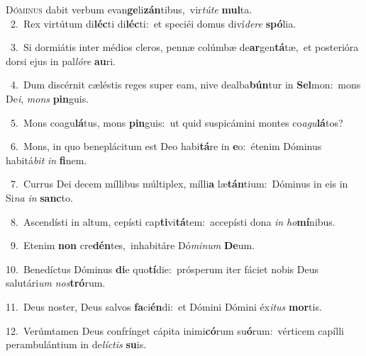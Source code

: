 \lettrine{\initial\textcolor{\initialcolor}{D}}{óminus} dabit verbum evan\-\textbf{ge}\-li\-\textbf{zán}\-tibus,~\star vir\-\textit{tú}\-\textit{te} \textbf{mul}\-ta.\\
{\numbfont\textcolor{\numbcolor}{~2.}}~Rex virtútum di\-\textbf{léc}\-ti di\-\textbf{léc}\-ti:~\star et speciéi domus diví\-\textit{de}\-\textit{re} \textbf{spó}\-lia.\par
{\numbfont\textcolor{\numbcolor}{~3.}}~Si dormiátis inter médios cleros, pennæ colúmbæ de\-\textbf{ar}\-gen\-\textbf{tá}\-tæ,~\star et posterióra dorsi ejus in pal\-\textit{ló}\-\textit{re} \textbf{au}\-ri.\par
{\numbfont\textcolor{\numbcolor}{~4.}}~Dum discérnit cæléstis reges super eam, nive dealba\-\textbf{bún}\-tur in \textbf{Sel}\-mon:~\star mons De\-\textit{i}\-, \textit{mons} \textbf{pin}\-guis.\par
{\numbfont\textcolor{\numbcolor}{~5.}}~Mons coagu\-\textbf{lá}\-tus, mons \textbf{pin}\-guis:~\star ut quid suspicámini montes co\-\textit{a}\-\textit{gu}\textbf{lá}tos?\par
{\numbfont\textcolor{\numbcolor}{~6.}}~Mons, in quo beneplácitum est Deo habi\-\textbf{tá}\-re in \textbf{e}\-o:~\star étenim Dóminus habitá\textit{bit} \textit{in} \textbf{fi}\-nem.\par
{\numbfont\textcolor{\numbcolor}{~7.}}~Currus Dei decem míllibus múltiplex, mílli\textbf{a} læ\-\textbf{tán}\-tium:~\star Dóminus in eis in Si\textit{na} \textit{in} \textbf{sanc}\-to.\par
{\numbfont\textcolor{\numbcolor}{~8.}}~Ascendísti in altum, cepísti cap\-\textbf{ti}\-vi\-\textbf{tá}\-tem:~\star accepísti dona \textit{in} \textit{ho}\-\textbf{mí}nibus.\par
{\numbfont\textcolor{\numbcolor}{~9.}}~Etenim \textbf{non} cre\-\textbf{dén}\-tes,~\star inhabitáre Dó\-\textit{mi}\-\textit{num} \textbf{De}\-um.\par
{\numbfont\textcolor{\numbcolor}{10.}}~Benedíctus Dóminus \textbf{di}\-e quo\-\textbf{tí}\-die:~\star prósperum iter fáciet nobis Deus salutári\textit{um} \textit{nos}\-\textbf{tró}rum.\par
{\numbfont\textcolor{\numbcolor}{11.}}~Deus noster, Deus salvos \textbf{fa}\-ci\-\textbf{én}\-di:~\star et Dómini Dómini éx\-\textit{i}\-\textit{tus} \textbf{mor}\-tis.\par
{\numbfont\textcolor{\numbcolor}{12.}}~Verúmtamen Deus confrínget cápita inimi\-\textbf{có}\-rum su\-\textbf{ó}\-rum:~\star vérticem capílli perambulántium in de\-\textit{líc}\-\textit{tis} \textbf{su}\-is.\par
